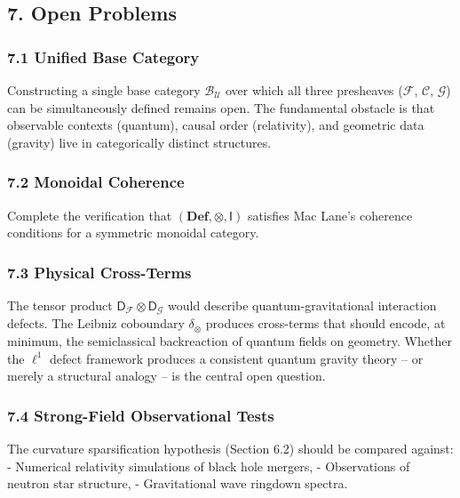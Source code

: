 \documentclass[
]{article}
\begin{document}
\subsection{7. Open Problems}\label{open-problems}

\subsubsection{7.1 Unified Base Category}\label{unified-base-category}

Constructing a single base category \(\mathcal{B}_\mathcal{U}\) over
which all three presheaves (\(\mathcal{F}\), \(\mathcal{C}\),
\(\mathcal{G}\)) can be simultaneously defined remains open. The
fundamental obstacle is that observable contexts (quantum), causal order
(relativity), and geometric data (gravity) live in categorically
distinct structures.

\subsubsection{7.2 Monoidal Coherence}\label{monoidal-coherence}

Complete the verification that \((\mathbf{Def}, \otimes, \mathsf{I})\)
satisfies Mac Lane's coherence conditions for a symmetric monoidal
category.

\subsubsection{7.3 Physical Cross-Terms}\label{physical-cross-terms}

The tensor product
\(\mathsf{D}_\mathcal{F} \otimes \mathsf{D}_\mathcal{G}\) would describe
quantum-gravitational interaction defects. The Leibniz coboundary
\(\delta_\otimes\) produces cross-terms that should encode, at minimum,
the semiclassical backreaction of quantum fields on geometry. Whether
the \(\ell^1\) defect framework produces a consistent quantum gravity
theory -- or merely a structural analogy -- is the central open
question.

\subsubsection{7.4 Strong-Field Observational
Tests}\label{strong-field-observational-tests}

The curvature sparsification hypothesis (Section 6.2) should be compared
against: - Numerical relativity simulations of black hole mergers, -
Observations of neutron star structure, - Gravitational wave ringdown
spectra.
\end{document}
